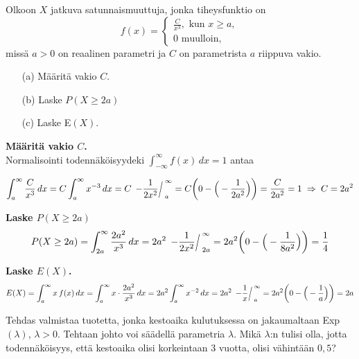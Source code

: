 \documentclass[12pt,a4paper]{article}
\begin{document}
\pagebreak
{}
Olkoon $X$ jatkuva satunnaismuuttuja, jonka tiheysfunktio on 
$$f(x)=\begin{cases}
    \frac{C}{x^{3}},\text{ kun }x\ge a,\\
    0 \text{ muulloin,}
\end{cases}$$
missä $a>0$ on reaalinen parametri ja $C$ on parametrista $a$ riippuva vakio. 
\begin{enumerate}
    \item[(a)] Määritä vakio $C$. 
    \item[(b)] Laske $P(X\ge 2a)$
    \item[(c)] Laske E$(X)$. 
\end{enumerate}

\vspace{0.4cm}

\begin{comment}
    

\end{comment}

\begin{kohta}
  \item \textbf{Määritä vakio $C$.} \\
  Normalisointi todennäköisyydeki $\int_{-\infty}^{\infty} f(x)\,dx=1$ antaa

  \[
    \int_a^\infty \frac{C}{x^{3}}\,dx
    = C\int_a^\infty x^{-3}\,dx
    = C\,\evalslant{-\frac{1}{2x^{2}}}{a}{\infty}
    = C\!\left(0-\Big(-\frac{1}{2a^{2}}\Big)\right)
    = \frac{C}{2a^{2}} = 1
    \;\Rightarrow\; C=2a^{2}
  \]

  \item \textbf{Laske $P(X\ge 2a)$}
  \[
    P(X\ge 2a)
    = \int_{2a}^{\infty} \frac{2a^{2}}{x^{3}}\,dx
    = 2a^{2}\,\evalslant{-\frac{1}{2x^{2}}}{2a}{\infty}
    = 2a^{2}\!\left(0-\Big(-\frac{1}{8a^{2}}\Big)\right)
    = \frac{1}{4}
  \]

  \item \textbf{Laske $E(X)$.}
  \[
    E(X)=\int_{a}^{\infty} x\,f(x)\,dx
    = \int_{a}^{\infty} x\cdot\frac{2a^{2}}{x^{3}}\,dx
    = 2a^{2}\int_{a}^{\infty} x^{-2}\,dx
    = 2a^{2}\,\evalslant{-\frac{1}{x}}{a}{\infty}
    = 2a^{2}\!\left(0-\Big(-\frac{1}{a}\Big)\right)
    = 2a
  \]
\end{kohta}








\pagebreak
{}
Tehdas valmistaa tuotetta, jonka kestoaika kulutuksessa
on jakaumaltaan Exp$(\lambda)$, $\lambda >0$. Tehtaan johto voi säädellä
parametria $\lambda$. Mikä $\lambda$:n tulisi olla, jotta todennäköisyys, että
kestoaika olisi korkeintaan 3 vuotta, olisi vähintään $0{,}5$?\\
\end{document}
